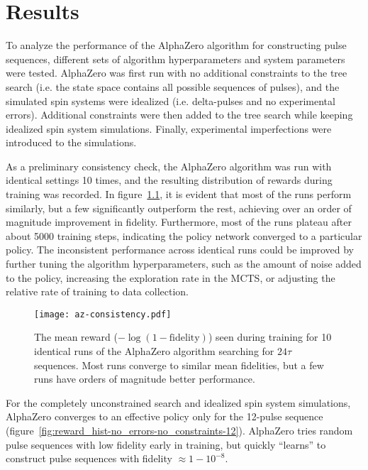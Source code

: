 \chapter{Results}

To analyze the performance of the AlphaZero algorithm for constructing pulse sequences, different sets of algorithm hyperparameters and system parameters were tested. AlphaZero was first run with no additional constraints to the tree search (i.e. the state space contains all possible sequences of pulses), and the simulated spin systems were idealized (i.e. delta-pulses and no experimental errors). Additional constraints were then added to the tree search while keeping idealized spin system simulations. Finally, experimental imperfections were introduced to the simulations.



As a preliminary consistency check, the AlphaZero algorithm was run with identical settings 10 times, and the resulting distribution of rewards during training was recorded. In figure~\ref{fig:az-consistency}, it is evident that most of the runs perform similarly, but a few significantly outperform the rest, achieving over an order of magnitude improvement in fidelity. Furthermore, most of the runs plateau after about 5000 training steps, indicating the policy network converged to a particular policy. The inconsistent performance across identical runs could be improved by further tuning the algorithm hyperparameters, such as the amount of noise added to the policy, increasing the exploration rate in the MCTS, or adjusting the relative rate of training to data collection.

\begin{figure}[H]
    \centering
    \texttt{[image: az-consistency.pdf]}
    \caption{The mean reward ($-\log(1-\text{fidelity})$) seen during training for 10 identical runs of the AlphaZero algorithm searching for $24\tau$ sequences. Most runs converge to similar mean fidelities, but a few runs have orders of magnitude better performance.}
    \label{fig:az-consistency}
\end{figure}


For the completely unconstrained search and idealized spin system simulations, AlphaZero converges to an effective
policy only for the 12-pulse sequence (figure~\ref{fig:reward_hist-no_errors-no_constraints-12}). AlphaZero tries random pulse sequences with low fidelity early in training, but quickly ``learns'' to construct pulse sequences with fidelity $\approx 1 - 10^{-8}$.

